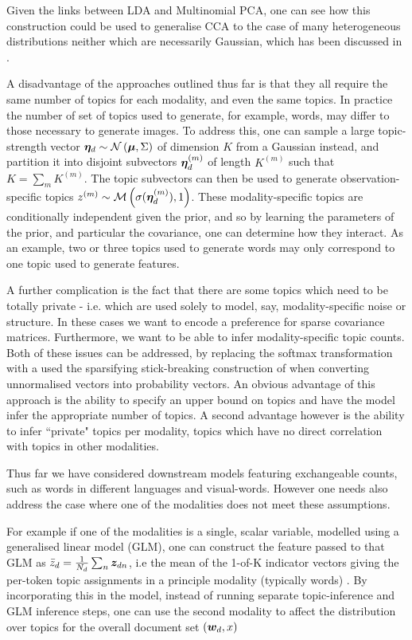 Given the links between LDA and Multinomial PCA\cite{Buntine2002}, one can see how this construction could be used to generalise CCA to the case of many heterogeneous distributions neither which are necessarily Gaussian, which has been discussed in \cite{Virtanen2012a}. 

A disadvantage of the approaches outlined thus far is that they all require the same number of topics for each modality, and even the same topics. In practice the number of set of topics used to generate, for example, words, may differ to those necessary to generate images. To address this, one can sample a large topic-strength vector $\bm \eta_d \sim \mathcal{N} \left( {\bm \mu}, {\Sigma} \right)$ of dimension $K$ from a Gaussian instead, and partition it into disjoint subvectors $\bm \eta_d^{(m)}$ of length $K^{(m)}$ such that $K = \sum_m K^{(m)}$. The topic subvectors can then be used to generate observation-specific topics $z^{(m)} \sim \mathcal{M} \left( {\sigma(\bm \eta_d^{(m)})},{1} \right)$. These modality-specific topics are conditionally independent given the prior, and so by learning the parameters of the prior, and particular the covariance, one can determine how they interact\cite{Salomatin2009}. As an example, two or three topics used to generate words may only correspond to one topic used to generate features.

A further complication is the fact that there are some topics which need to be totally private - i.e. which are used solely to model, say, modality-specific noise or structure. In these cases we want to encode a preference for sparse covariance matrices. Furthermore, we want to be able to infer modality-specific topic counts. Both of these issues can be addressed, by replacing the softmax transformation with a used the sparsifying stick-breaking construction of \cite{Paisley2012} when converting unnormalised vectors into probability vectors\cite{Virtanen2012a}. An obvious advantage of this approach is the ability to specify an upper bound on topics and have the model infer the appropriate number of topics. A second advantage however is the ability to infer ``private" topics per modality, topics which have no direct correlation with topics in other modalities.

Thus far we have considered downstream models featuring exchangeable counts, such as words in different languages and visual-words. However one needs also address the case where one of the modalities does not meet these assumptions.

For example if one of the modalities is a single, scalar variable, modelled using a generalised linear model (GLM), one can construct the feature passed to that GLM as $\bar{z}_d = \frac{1}{N_d} \sum_n \bm z_{dn}$, i.e the mean of the 1-of-K indicator vectors giving the per-token topic assignments in a principle modality (typically words) \cite{Blei2008}. By incorporating this in the model, instead of running separate topic-inference and GLM inference steps, one can use the second modality to affect the distribution over topics for the overall document set $({ \bm w_d }, x)$

